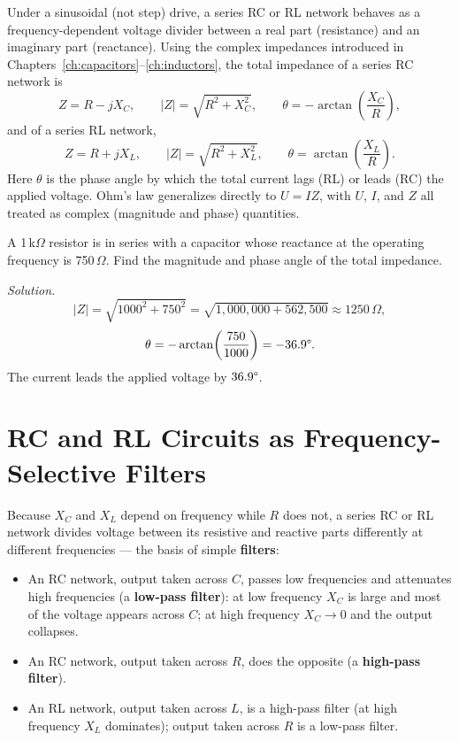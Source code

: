 Under a sinusoidal (not step) drive, a series RC or RL network behaves as
a frequency-dependent voltage divider between a real part (resistance)
and an imaginary part (reactance). Using the complex impedances
introduced in Chapters~\ref{ch:capacitors}--\ref{ch:inductors}, the
total impedance of a series RC network is
\[
Z = R - jX_C, \qquad |Z| = \sqrt{R^2 + X_C^2}, \qquad
\theta = -\arctan\!\left(\frac{X_C}{R}\right),
\]
and of a series RL network,
\[
Z = R + jX_L, \qquad |Z| = \sqrt{R^2 + X_L^2}, \qquad
\theta = \arctan\!\left(\frac{X_L}{R}\right).
\]
Here $\theta$ is the phase angle by which the total current lags (RL) or
leads (RC) the applied voltage. Ohm's law generalizes directly to
$U = IZ$, with $U$, $I$, and $Z$ all treated as complex (magnitude and
phase) quantities.

\begin{examplebox}
A 1\,k$\Omega$ resistor is in series with a capacitor whose reactance at
the operating frequency is 750\,$\Omega$. Find the magnitude and phase
angle of the total impedance.

\emph{Solution.}
\[
|Z| = \sqrt{1000^2 + 750^2} = \sqrt{1{,}000{,}000+562{,}500} \approx 1250\,\Omega,
\]
\[
\theta = -\arctan\!\left(\frac{750}{1000}\right) = -36.9\degree.
\]
The current leads the applied voltage by $36.9\degree$.
\end{examplebox}

\section{RC and RL Circuits as Frequency-Selective Filters}

Because $X_C$ and $X_L$ depend on frequency while $R$ does not, a series
RC or RL network divides voltage between its resistive and reactive
parts differently at different frequencies --- the basis of simple
\textbf{filters}:

\begin{itemize}
\item An RC network, output taken across $C$, passes low frequencies and
attenuates high frequencies (a \textbf{low-pass filter}): at low
frequency $X_C$ is large and most of the voltage appears across $C$; at
high frequency $X_C \to 0$ and the output collapses.
\item An RC network, output taken across $R$, does the opposite (a
\textbf{high-pass filter}).
\item An RL network, output taken across $L$, is a high-pass filter (at
high frequency $X_L$ dominates); output taken across $R$ is a low-pass
filter.
\end{itemize}

